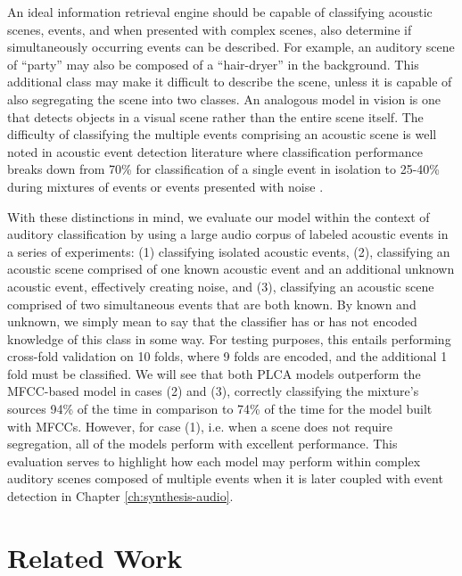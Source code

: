 \documentclass[a4paper,10pt,final]{ThesisStyle}
\begin{document}
An ideal information retrieval engine should be capable of classifying acoustic scenes, events, and when presented with complex scenes, also determine if simultaneously occurring events can be described.  For example, an auditory scene of ``party'' may also be composed of a ``hair-dryer'' in the background.  This additional class may make it difficult to describe the scene, unless it is capable of also segregating the scene into two classes.  An analogous model in vision is one that detects objects in a visual scene rather than the entire scene itself.  The difficulty of classifying the multiple events comprising an acoustic scene is well noted in acoustic event detection literature where classification performance breaks down from 70\% for classification of a single event in isolation to 25-40\% during mixtures of events or events presented with noise \cite{Temko2007}.  

With these distinctions in mind, we evaluate our model within the context of auditory classification by using a large audio corpus of labeled acoustic events in a series of experiments: (1) classifying isolated acoustic events, (2), classifying an acoustic scene comprised of one known acoustic event and an additional unknown acoustic event, effectively creating noise, and (3), classifying an acoustic scene comprised of two simultaneous events that are both known.  By known and unknown, we simply mean to say that the classifier has or has not encoded knowledge of this class in some way.  For testing purposes, this entails performing cross-fold validation on 10 folds, where 9 folds are encoded, and the additional 1 fold must be classified.  We will see that both PLCA models outperform the MFCC-based model in cases (2) and (3), correctly classifying the mixture's sources 94\% of the time in comparison to 74\% of the time for the model built with MFCCs.  However, for case (1), i.e. when a scene does not require segregation, all of the models perform with excellent performance.  This evaluation serves to highlight how each model may perform within complex auditory scenes composed of multiple events when it is later coupled with event detection in Chapter \ref{ch:synthesis-audio}.  


\section{Related Work}
\end{document}
